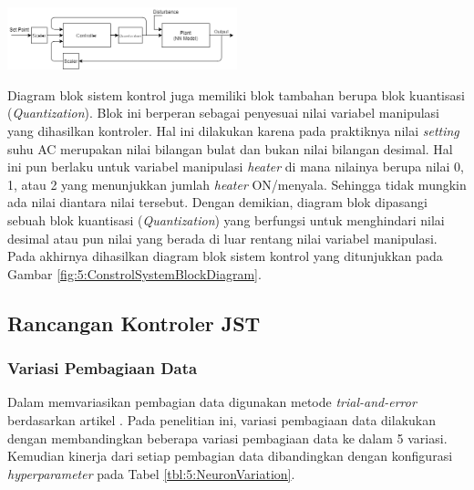 \documentclass[a4paper,10pt]{article}
\makeatletter
\newenvironment{body}{\begin{multicols}{2}}{\end{multicols}}
\renewenvironment{figure}
{\def\@captype{figure}%
	\captionsetup{labelsep=period,format=hang,font=footnotesize,justification=justified}
}
{}
\makeatother
\begin{document}
\begin{body}
		\begin{figure}
			\centering
			\includegraphics[width=0.5\textwidth]{figures/ControlDesignDiagramII}
			\caption{Diagram blok sistem kontrol berbasis JST}
			\label{fig:5:ConstrolSystemBlockDiagram}
		\end{figure}
		
		Diagram blok sistem kontrol juga memiliki blok tambahan berupa blok kuantisasi (\textit{Quantization}). Blok ini berperan sebagai penyesuai nilai variabel manipulasi yang dihasilkan kontroler. Hal ini dilakukan karena pada praktiknya nilai \textit{setting} suhu AC merupakan nilai bilangan bulat dan bukan nilai bilangan desimal. Hal ini pun berlaku untuk variabel manipulasi \textit{heater} di mana nilainya berupa nilai 0, 1, atau 2 yang menunjukkan jumlah \textit{heater} ON/menyala. Sehingga tidak mungkin ada nilai diantara nilai tersebut. Dengan demikian, diagram blok dipasangi sebuah blok kuantisasi (\textit{Quantization}) yang berfungsi untuk menghindari nilai desimal atau pun nilai yang berada di luar rentang nilai variabel manipulasi. Pada akhirnya dihasilkan diagram blok sistem kontrol yang ditunjukkan pada Gambar \ref{fig:5:ConstrolSystemBlockDiagram}.\\
		
		\subsection{Rancangan Kontroler JST}
		
		\subsubsection{Variasi Pembagiaan Data}
		
		Dalam memvariasikan pembagian data digunakan metode \textit{trial-and-error} berdasarkan artikel \cite{DataSplitting}. Pada penelitian ini, variasi pembagiaan data dilakukan dengan membandingkan beberapa variasi pembagiaan data ke dalam 5 variasi. Kemudian kinerja dari setiap pembagian data dibandingkan dengan konfigurasi \textit{hyperparameter} pada Tabel \ref{tbl:5:NeuronVariation}.
		

\end{body}
\end{document}
